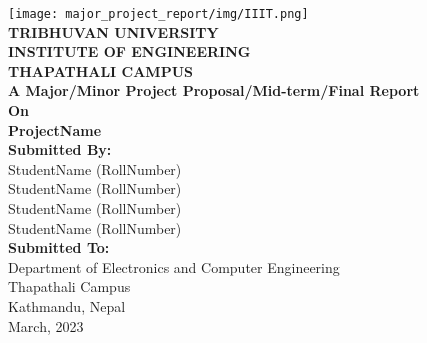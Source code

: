 
\thispagestyle{empty} %


\begin{titlepage}
{
	\thispagestyle{empty}
	\centering
	\normalsize
	  
	\texttt{[image: major\_project\_report/img/IIIT.png]}\\
	\textbf{TRIBHUVAN UNIVERSITY}\\
	\textbf{INSTITUTE OF ENGINEERING}\\
	\textbf{THAPATHALI CAMPUS}
	\\[2cm]
	
	{\bf A Major/Minor Project Proposal/Mid-term/Final Report }\\
	{\bf On } \\ 
	{\bf ProjectName } \\[2.5cm]
	
	
	{\bf Submitted By:} \\
	StudentName \hspace{1cm}(RollNumber)\\
	StudentName \hspace{1cm}(RollNumber)\\
	StudentName \hspace{1cm}(RollNumber)\\
	StudentName \hspace{1cm}(RollNumber)\\ [1.5cm]
	
    
    {\bf Submitted To: } \\
	Department of Electronics and Computer Engineering \\
	Thapathali Campus \\
	Kathmandu, Nepal \\ [1.5cm]
 
	March, 2023
	
}
\end{titlepage}

